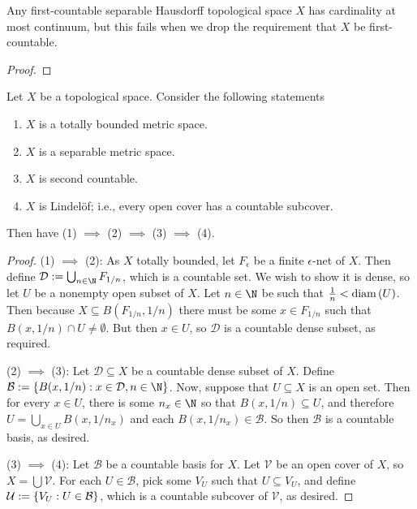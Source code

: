 \documentclass[10pt]{article}
\begin{document}
\begin{proposition}
    Any first-countable separable Hausdorff topological space  $X$ has cardinality at most continuum, but this fails when we drop the requirement that $X$ be first-countable.
\end{proposition}
\begin{proof}
\end{proof}

\begin{proposition}[Exercise 3]
    Let $X$ be a topological space.
    Consider the following statements
    \begin{enumerate}
        \item $X$ is a totally bounded metric space.
        \item $X$ is a separable metric space.
        \item $X$ is second countable.
        \item $X$ is Lindel\"of; i.e., every open cover has a countable subcover.
    \end{enumerate}
    Then have (1) $\implies$ (2) $\implies$ (3) $\implies$ (4).
\end{proposition}
\begin{proof}
    (1) $\implies$ (2): As $X$ totally bounded, let $F_{\epsilon}$ be a finite $\epsilon$-net of $X$.
    Then define $\mathcal{D} := \bigcup_{n \in \N} F_{1/n}$, which is a countable set.
    We wish to show it is dense, so let $U$ be a nonempty open subset of $X$.
    Let $n \in \N$ be such that $\frac{1}{n} < \text{diam} \left( U \right)$.
    Then because $X \subseteq B(F_{1/n}, 1/n)$ there must be some $x \in F_{1/n}$ such that $B(x, 1/n) \cap U \neq \emptyset$.
    But then $x \in U$, so $\mathcal{D}$ is a countable dense subset, as required.

    (2) $\implies$ (3): Let $\mathcal{D} \subseteq X$ be a countable dense subset of $X$.
    Define $\mathcal{B} := \setbuild{B(x, 1/n)}{x \in \mathcal{D}, n \in \N}$.
    Now, suppose that $U \subseteq X$ is an open set.
    Then for every $x \in U$, there is some $n_x \in \N$ so that $B(x,1/n) \subseteq U$, and therefore $U = \bigcup_{x \in U} B(x, 1/n_x)$ and each $B(x, 1/n_x) \in \mathcal{B}$.
    So then $\mathcal{B}$ is a countable basis, as desired.

    (3) $\implies$ (4): Let $\mathcal{B}$ be a countable basis for $X$.
    Let $\mathcal{V}$ be an open cover of $X$, so $X = \bigcup \mathcal{V}$.
    For each $U \in \mathcal{B}$, pick some $V_U$ such that $U \subseteq V_U$, and define $\mathcal{U} := \left\{ {V_U} : {U \in \mathcal{B}} \right\}$, which is a countable subcover of $\mathcal{V}$, as desired.
\end{proof}
\end{document}
